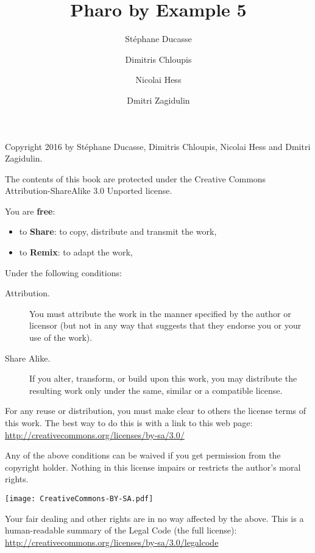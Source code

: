 \documentclass[10pt,twoside,english,showtrims]{support/latex/sbabook/sbabook}
\title{Pharo by Example 5}
\author{
    St\'ephane Ducasse \and
    Dimitris Chloupis \and Nicolai Hess \and Dmitri Zagidulin}
\date{\gitdate\titlebreak[\smallskip]{ -- }\protect\gitCommitInfo}
\begin{document}
\maketitle
\pagestyle{titlingpage}
\thispagestyle{titlingpage} %

\cleartoverso
{\small

  Copyright 2016 by St\'ephane Ducasse, Dimitris Chloupis, Nicolai Hess and Dmitri Zagidulin.

  The contents of this book are protected under the Creative Commons
  Attribution-ShareAlike 3.0 Unported license.

  You are \textbf{free}:
  \begin{itemize}
  \item to \textbf{Share}: to copy, distribute and transmit the work,
  \item to \textbf{Remix}: to adapt the work,
  \end{itemize}

  Under the following conditions:
  \begin{description}
  \item[Attribution.] You must attribute the work in the manner specified by the
    author or licensor (but not in any way that suggests that they endorse you
    or your use of the work).
  \item[Share Alike.] If you alter, transform, or build upon this work, you may
    distribute the resulting work only under the same, similar or a compatible
    license.
  \end{description}

  For any reuse or distribution, you must make clear to others the
  license terms of this work. The best way to do this is with a link to
  this web page: \\
  \url{http://creativecommons.org/licenses/by-sa/3.0/}

  Any of the above conditions can be waived if you get permission from
  the copyright holder. Nothing in this license impairs or restricts the
  author's moral rights.

  \begin{center}
    \texttt{[image: CreativeCommons-BY-SA.pdf]}
  \end{center}

  Your fair dealing and other rights are in no way affected by the
  above. This is a human-readable summary of the Legal Code (the full
  license): \\
  \url{http://creativecommons.org/licenses/by-sa/3.0/legalcode}

}
\end{document}
